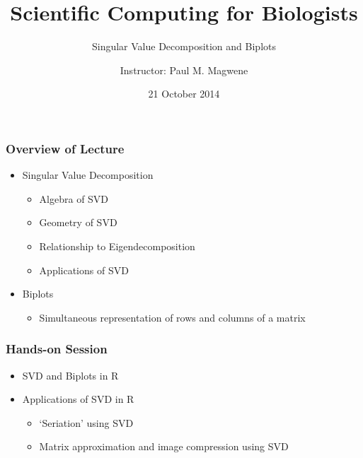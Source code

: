 \documentclass{beamer}
\title{Scientific Computing for Biologists}
\subtitle{Singular Value Decomposition and Biplots}
\author{Instructor: Paul M. Magwene}
\date{21 October 2014}
\begin{document}
\begin{frame}
\titlepage
\end{frame}

\begin{frame}
  \frametitle{Overview of Lecture}
  
\begin{itemize}
		\item Singular Value Decomposition
		\begin{itemize}
			\item Algebra of SVD
			\item Geometry of SVD
			\item Relationship to Eigendecomposition
			\item Applications of SVD			
		\end{itemize}		
		\item Biplots
		\begin{itemize}
			\item Simultaneous representation of rows and columns of a matrix
		\end{itemize}			
\end{itemize}

\end{frame}

\begin{frame}
  \frametitle{Hands-on Session}
\begin{itemize}
    \item SVD and Biplots in R
    \item Applications of SVD in R
    		\begin{itemize}
    		\item `Seriation' using SVD
			  \item Matrix approximation and image compression using SVD
		\end{itemize}
\end{itemize} 


\end{frame}		
\end{document}

